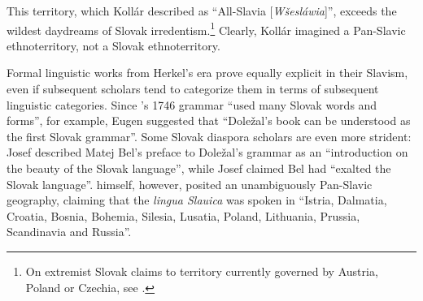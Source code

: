 \noindent This territory, which Kollár described as “All-Slavia [\textit{Wšesláwia}]”, exceeds the wildest daydreams of Slovak irredentism.\footnote{On extremist Slovak claims to territory currently governed by Austria, Poland or Czechia, see \citet[88, 92]{mares_extreme_2009}.} Clearly, Kollár imagined a Pan-Slavic ethnoterritory, not a Slovak ethnoterritory.

Formal linguistic works from Herkel’s era prove equally explicit in their Slavism, even if subsequent scholars tend to categorize them in terms of subsequent linguistic categories. Since \citeauthor{dolezal_grammatica_1746}’s 1746 grammar “used many Slovak words and forms”, for example, Eugen \citet[265]{jona_pavel_1978} suggested that “Doležal’s book can be understood as the first Slovak grammar”. Some Slovak diaspora scholars are even more strident: Josef \citet[101]{kirschbaum_slovak_1975} described Matej Bel’s preface to Doležal’s grammar as an “introduction on the beauty of the Slovak language”, while Josef \citet[22]{mikus_pride_1973} claimed Bel had “exalted the Slovak language”. \citet[ix (no page numbers)]{bel_praefatio_1746} himself, however, posited an unambiguously Pan-Slavic geography, claiming that the \textit{lingua Slauica} was spoken in “Istria, Dalmatia, Croatia, Bosnia, Bohemia, Silesia, Lusatia, Poland, Lithuania, Prussia, Scandinavia and Russia”.

